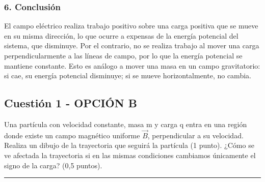 \subsubsection*{6. Conclusión}
\begin{cajaconclusion}
El campo eléctrico realiza trabajo positivo sobre una carga positiva que se mueve en su misma dirección, lo que ocurre a expensas de la energía potencial del sistema, que disminuye. Por el contrario, no se realiza trabajo al mover una carga perpendicularmente a las líneas de campo, por lo que la energía potencial se mantiene constante. Esto es análogo a mover una masa en un campo gravitatorio: si cae, su energía potencial disminuye; si se mueve horizontalmente, no cambia.
\end{cajaconclusion}

\newpage

\subsection{Cuestión 1 - OPCIÓN B}
\label{subsec:4B_2007_jun_ord}

\begin{cajaenunciado}
Una partícula con velocidad constante, masa m y carga q entra en una región donde existe un campo magnético uniforme $\vec{B}$, perpendicular a su velocidad. Realiza un dibujo de la trayectoria que seguirá la partícula (1 punto). ¿Cómo se ve afectada la trayectoria si en las mismas condiciones cambiamos únicamente el signo de la carga? (0,5 puntos).
\end{cajaenunciado}
\hrule

